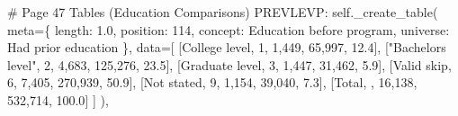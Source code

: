 \documentclass[
  11pt,
  a4paper,
]{article}
\newenvironment{Shaded}{\begin{snugshade}}{\end{snugshade}}
\newcommand{\CommentTok}[1]{\textcolor[rgb]{0.37,0.37,0.37}{#1}}
\newcommand{\NormalTok}[1]{\textcolor[rgb]{0.00,0.23,0.31}{#1}}
\newcommand{\OperatorTok}[1]{\textcolor[rgb]{0.37,0.37,0.37}{#1}}
\newcommand{\StringTok}[1]{\textcolor[rgb]{0.13,0.47,0.30}{#1}}
\newcommand{\VariableTok}[1]{\textcolor[rgb]{0.07,0.07,0.07}{#1}}
\begin{document}
\begin{Shaded}
\begin{Highlighting}[]
    \CommentTok{\# Page 47 Tables (Education Comparisons)}
    \StringTok{\textquotesingle{}PREVLEVP\textquotesingle{}}\NormalTok{: }\VariableTok{self}\NormalTok{.\_create\_table(}
\NormalTok{        meta}\OperatorTok{=}\NormalTok{\{}
            \StringTok{\textquotesingle{}length\textquotesingle{}}\NormalTok{: }\StringTok{\textquotesingle{}1.0\textquotesingle{}}\NormalTok{, }\StringTok{\textquotesingle{}position\textquotesingle{}}\NormalTok{: }\StringTok{\textquotesingle{}114\textquotesingle{}}\NormalTok{,}
            \StringTok{\textquotesingle{}concept\textquotesingle{}}\NormalTok{: }\StringTok{\textquotesingle{}Education before program\textquotesingle{}}\NormalTok{,}
            \StringTok{\textquotesingle{}universe\textquotesingle{}}\NormalTok{: }\StringTok{\textquotesingle{}Had prior education\textquotesingle{}}
\NormalTok{        \},}
\NormalTok{        data}\OperatorTok{=}\NormalTok{[}
\NormalTok{            [}\StringTok{\textquotesingle{}College level\textquotesingle{}}\NormalTok{, }\StringTok{\textquotesingle{}1\textquotesingle{}}\NormalTok{, }\StringTok{\textquotesingle{}1,449\textquotesingle{}}\NormalTok{, }\StringTok{\textquotesingle{}65,997\textquotesingle{}}\NormalTok{, }\StringTok{\textquotesingle{}12.4\textquotesingle{}}\NormalTok{],}
\NormalTok{            [}\StringTok{"Bachelor\textquotesingle{}s level"}\NormalTok{, }\StringTok{\textquotesingle{}2\textquotesingle{}}\NormalTok{, }\StringTok{\textquotesingle{}4,683\textquotesingle{}}\NormalTok{, }\StringTok{\textquotesingle{}125,276\textquotesingle{}}\NormalTok{, }\StringTok{\textquotesingle{}23.5\textquotesingle{}}\NormalTok{],}
\NormalTok{            [}\StringTok{\textquotesingle{}Graduate level\textquotesingle{}}\NormalTok{, }\StringTok{\textquotesingle{}3\textquotesingle{}}\NormalTok{, }\StringTok{\textquotesingle{}1,447\textquotesingle{}}\NormalTok{, }\StringTok{\textquotesingle{}31,462\textquotesingle{}}\NormalTok{, }\StringTok{\textquotesingle{}5.9\textquotesingle{}}\NormalTok{],}
\NormalTok{            [}\StringTok{\textquotesingle{}Valid skip\textquotesingle{}}\NormalTok{, }\StringTok{\textquotesingle{}6\textquotesingle{}}\NormalTok{, }\StringTok{\textquotesingle{}7,405\textquotesingle{}}\NormalTok{, }\StringTok{\textquotesingle{}270,939\textquotesingle{}}\NormalTok{, }\StringTok{\textquotesingle{}50.9\textquotesingle{}}\NormalTok{],}
\NormalTok{            [}\StringTok{\textquotesingle{}Not stated\textquotesingle{}}\NormalTok{, }\StringTok{\textquotesingle{}9\textquotesingle{}}\NormalTok{, }\StringTok{\textquotesingle{}1,154\textquotesingle{}}\NormalTok{, }\StringTok{\textquotesingle{}39,040\textquotesingle{}}\NormalTok{, }\StringTok{\textquotesingle{}7.3\textquotesingle{}}\NormalTok{],}
\NormalTok{            [}\StringTok{\textquotesingle{}Total\textquotesingle{}}\NormalTok{, }\StringTok{\textquotesingle{}\textquotesingle{}}\NormalTok{, }\StringTok{\textquotesingle{}16,138\textquotesingle{}}\NormalTok{, }\StringTok{\textquotesingle{}532,714\textquotesingle{}}\NormalTok{, }\StringTok{\textquotesingle{}100.0\textquotesingle{}}\NormalTok{]}
\NormalTok{        ]}
\NormalTok{    ),}


\end{Highlighting}
\end{Shaded}
\end{document}
